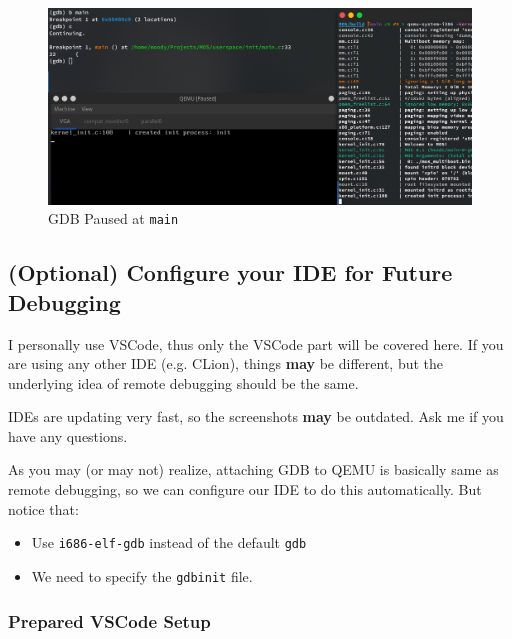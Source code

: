 \begin{figure}[ht]
    \centering
    \includegraphics[width=\textwidth]{assets/c1.gdb-paused.png}
    \caption{GDB Paused at \texttt{main}}
    \label{fig:gdb-paused}
\end{figure}

\subsection{(Optional) Configure your IDE for Future Debugging} \label{sec:ide-config}

\begin{note}
    \item I personally use VSCode, thus only the VSCode part will be covered here. If you are
    using any other IDE (e.g. CLion), things \textbf{may} be different, but the underlying idea
    of remote debugging should be the same.

    \item IDEs are updating very fast, so the screenshots \textbf{may} be outdated. Ask me if you
    have any questions.
\end{note}

As you may (or may not) realize, attaching GDB to QEMU is basically same as remote debugging, so
we can configure our IDE to do this automatically. But notice that:

\begin{itemize}
    \item Use \texttt{i686-elf-gdb} instead of the default \texttt{gdb}
    \item We need to specify the \texttt{gdbinit} file.
\end{itemize}

\subsubsection{Prepared VSCode Setup} \label{sec:vscode-config}

